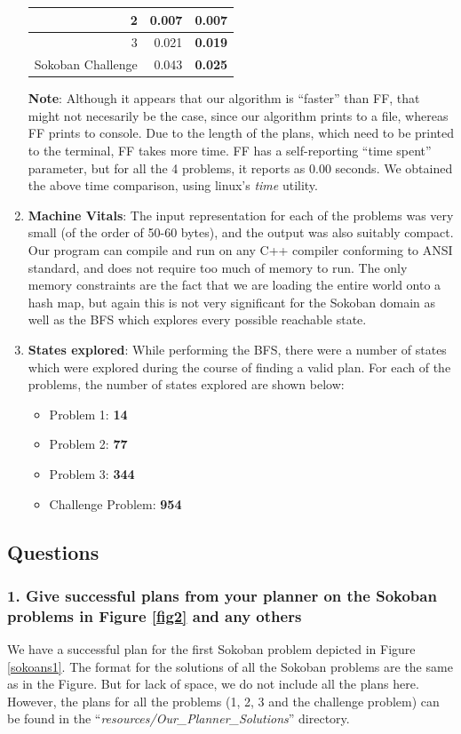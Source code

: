 \documentclass[10pt, letter]{article}
\begin{document}
\begin{enumerate}
\begin{table}[htbp]
\begin{tabular}{|r|r|r|}
2 & 0.007 & \textbf{0.007} \\ \hline
3 & 0.021 & \textbf{0.019} \\ \hline
Sokoban Challenge & 0.043 & \textbf{0.025} \\ \hline
\end{tabular}
\label{tab1}
\end{table}
\textbf{Note}: Although it appears that our algorithm is ``faster'' than FF, that might not necesarily be the case, since our algorithm prints to a file, whereas FF prints to console. Due to the length of the plans, which need to be printed to the terminal, FF takes more time. FF has a self-reporting ``time spent'' parameter, but for all the 4 problems, it reports as 0.00 seconds. We obtained the above time comparison, using linux's \textit{time} utility.

\item \textbf{Machine Vitals}: The input representation for each of the problems was very small (of the order of 50-60 bytes), and the output was also suitably compact. Our program can compile and run on any C++ compiler conforming to ANSI standard, and does not require too much of memory to run. The only memory constraints are the fact that we are loading the entire world onto a hash map, but again this is not very significant for the Sokoban domain as well as the BFS which explores every possible reachable state.

\item \textbf{States explored}: While performing the BFS, there were a number of states which were explored during the course of finding a valid plan. For each of the problems, the number of states explored are shown below:
\begin{itemize}
\item Problem 1: \textbf{14}
\item Problem 2: \textbf{77}
\item Problem 3: \textbf{344}
\item Challenge Problem: \textbf{954}
\end{itemize}
\end{enumerate}
\subsection{Questions}

\subsubsection*{1. Give successful plans from your planner on the Sokoban problems in Figure \ref{fig2} and any others}
We have a successful plan for the first Sokoban problem depicted in Figure \ref{sokoans1}. The format for the solutions of all the Sokoban problems are the same as in the Figure. But for lack of space, we do not include all the plans here. However, the plans for all the problems (1, 2, 3 and the challenge problem) can be found in the ``\textit{resources/Our\_Planner\_Solutions}'' directory.
\end{document}
